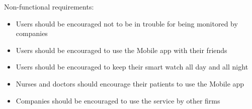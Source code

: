 Non-functional requirements:
\begin{itemize}
    \item Users should be encouraged not to be in trouble for being monitored by companies
    \item Users should be encouraged to use the Mobile app with their friends
    \item Users should be encouraged to keep their smart watch all day and all night
    \item Nurses and doctors should encourage their patients to use the Mobile app 
    \item Companies should be encouraged to use the service by other firms
\end{itemize}